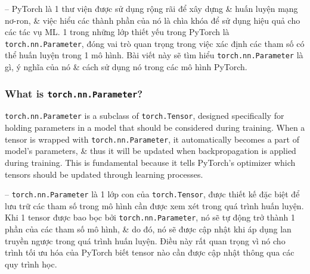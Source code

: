 \documentclass{article}
\begin{document}
-- PyTorch là 1 thư viện được sử dụng rộng rãi để xây dựng \& huấn luyện mạng nơ-ron, \& việc hiểu các thành phần của nó là chìa khóa để sử dụng hiệu quả cho các tác vụ ML. 1 trong những lớp thiết yếu trong PyTorch là {\tt torch.nn.Parameter}, đóng vai trò quan trọng trong việc xác định các tham số có thể huấn luyện trong 1 mô hình. Bài viết này sẽ tìm hiểu {\tt torch.nn.Parameter} là gì, ý nghĩa của nó \& cách sử dụng nó trong các mô hình PyTorch.


\subsubsection{What is {\tt torch.nn.Parameter}?}
{\tt torch.nn.Parameter} is a subclass of {\tt torch.Tensor}, designed specifically for holding parameters in a model that should be considered during training. When a tensor is wrapped with {\tt torch.nn.Parameter}, it automatically becomes a part of model's parameters, \& thus it will be updated when backpropagation is applied during training. This is fundamental because it tells PyTorch's optimizer which tensors should be updated through learning processes.

-- {\tt torch.nn.Parameter} là 1 lớp con của {\tt torch.Tensor}, được thiết kế đặc biệt để lưu trữ các tham số trong mô hình cần được xem xét trong quá trình huấn luyện. Khi 1 tensor được bao bọc bởi {\tt torch.nn.Parameter}, nó sẽ tự động trở thành 1 phần của các tham số mô hình, \& do đó, nó sẽ được cập nhật khi áp dụng lan truyền ngược trong quá trình huấn luyện. Điều này rất quan trọng vì nó cho trình tối ưu hóa của PyTorch biết tensor nào cần được cập nhật thông qua các quy trình học.

\end{document}
